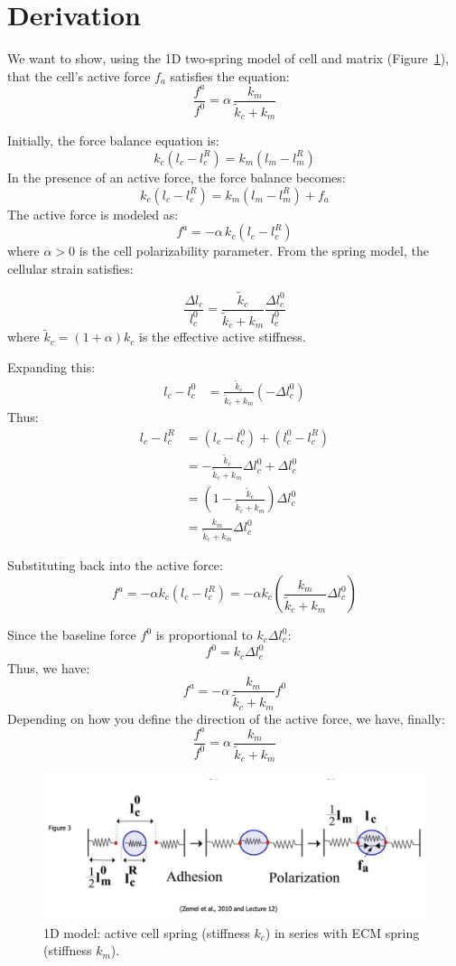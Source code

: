 \documentclass{article}
\begin{document}
\section*{Derivation}

We want to show, using the 1D two‐spring model of cell and matrix (Figure~\ref{fig:1d-spring-model}),
that the cell’s active force \(f_a\) satisfies the equation:
\[
\frac{f^{a}}{f^{0}} = \alpha \,\frac{k_{m}}{\tilde{k}_{c} + k_{m}}
\]

Initially, the force balance equation is:
\[
k_c (l_c - l_c^R) = k_m (l_m - l_m^R)
\]
In the presence of an active force, the force balance becomes:
\[
k_c (l_c - l_c^R) = k_m (l_m - l_m^R) + f_a
\]
The active force is modeled as:
\[
f^a = - \alpha \, k_c (l_c - l_c^R)
\]
where \(\alpha > 0\) is the cell polarizability parameter.
From the spring model, the cellular strain satisfies:

\[
\frac{\Delta l_c}{l_c^0} = \frac{\tilde{k}_c}{\tilde{k}_c + k_m} \frac{\Delta l_c^0}{l_c^0}
\]
where \(\tilde{k}_c = (1 + \alpha) k_c\) is the effective active stiffness.

Expanding this:
\begin{align*}
l_c - l_c^0 &= \frac{\tilde{k}_c}{\tilde{k}_c + k_m} (-\Delta l_c^0)
\end{align*}
Thus:
\begin{align*}
l_c - l_c^R &= (l_c - l_c^0) + (l_c^0 - l_c^R) \\
&= - \frac{\tilde{k}_c}{\tilde{k}_c + k_m} \Delta l_c^0 + \Delta l_c^0 \\
&= \left(1 - \frac{\tilde{k}_c}{\tilde{k}_c + k_m} \right) \Delta l_c^0 \\
&= \frac{k_m}{\tilde{k}_c + k_m} \Delta l_c^0
\end{align*}

Substituting back into the active force:
\[
f^a = -\alpha k_c (l_c - l_c^R) = -\alpha k_c \left( \frac{k_m}{\tilde{k}_c + k_m} \Delta l_c^0 \right)
\]

Since the baseline force \(f^0\) is proportional to \(k_c \Delta l_c^0\):
\[
f^0 = k_c \Delta l_c^0
\]
Thus, we have:
\[
f^a = - \alpha \, \frac{k_m}{\tilde{k}_c + k_m} f^0
\]
Depending on how you define the direction of the active force, we have, finally:
\[
\boxed{
\frac{f^a}{f^0} = \alpha \, \frac{k_m}{\tilde{k}_c + k_m}
}
\]


\begin{figure}[h!]
  \centering
  \includegraphics[width=1\textwidth]{springs}
  \caption{1D model: active cell spring (stiffness \(k_c\)) in series with 
  ECM spring (stiffness \(k_m\)).}
  \label{fig:1d-spring-model}
\end{figure}
\end{document}
